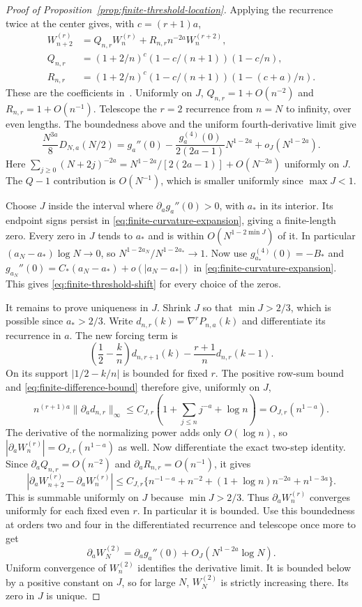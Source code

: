 \begin{proof}[Proof of Proposition~\ref{prop:finite-threshold-location}]
Applying the recurrence twice at the center gives, with $c=(r+1)a$,
\begin{align*}
 W_{n+2}^{(r)}&=Q_{n,r}W_n^{(r)}+R_{n,r}n^{-2a}W_n^{(r+2)},\\
 Q_{n,r}&=(1+2/n)^c(1-c/(n+1))(1-c/n),\\
 R_{n,r}&=(1+2/n)^c(1-c/(n+1))(1-(c+a)/n).
\end{align*}
These are the coefficients in~\cite[(4.11)]{tv2026}.
Uniformly on $J$, $Q_{n,r}=1+O(n^{-2})$ and $R_{n,r}=1+O(n^{-1})$.
Telescope the $r=2$ recurrence from $n=N$ to infinity, over even
lengths. The boundedness above and the uniform fourth-derivative limit give
\begin{equation}\label{eq:finite-curvature-expansion}
 \frac{N^{3a}}8D_{N,a}(N/2)
 =g_a''(0)-\frac{g_a^{(4)}(0)}{2(2a-1)}N^{1-2a}
               +o_J(N^{1-2a}).
\end{equation}
Here $\sum_{j\ge0}(N+2j)^{-2a}
 =N^{1-2a}/[2(2a-1)]+O(N^{-2a})$ uniformly on $J$.
The $Q-1$ contribution is $O(N^{-1})$, which is smaller uniformly
since $\max J<1$.

Choose $J$ inside the interval where $\partial_a g_a''(0)>0$,
with $a_*$ in its interior. Its endpoint signs persist in
\eqref{eq:finite-curvature-expansion}, giving a finite-length zero.
Every zero in $J$ tends to $a_*$ and is within
$O(N^{1-2\min J})$ of it. In particular $(a_N-a_*)\log N\to0$,
so $N^{1-2a_N}/N^{1-2a_*}\to1$. Now use
$g_{a_*}^{(4)}(0)=-B_*$ and
$g_{a_N}''(0)=C_*(a_N-a_*)+o(|a_N-a_*|)$ in
\eqref{eq:finite-curvature-expansion}. This gives
\eqref{eq:finite-threshold-shift} for every choice of the zeros.

It remains to prove uniqueness in $J$. Shrink $J$ so that
$\min J>2/3$, which is possible since $a_*>2/3$.
Write $d_{n,r}(k)=\nabla^rP_{n,a}(k)$ and differentiate its recurrence
in $a$. The new forcing term is
\[
 \left(\frac12-\frac kn\right)d_{n,r+1}(k)
       -\frac{r+1}{n}d_{n,r}(k-1).
\]
On its support $|1/2-k/n|$ is bounded for fixed $r$.
The positive row-sum bound and
\eqref{eq:finite-difference-bound} therefore give, uniformly on $J$,
\[
 n^{(r+1)a}\|\partial_a d_{n,r}\|_\infty
 \le C_{J,r}\left(1+\sum_{j\le n}j^{-a}+\log n\right)
 =O_{J,r}(n^{1-a}).
\]
The derivative of the normalizing power adds only $O(\log n)$, so
$|\partial_a W_n^{(r)}|=O_{J,r}(n^{1-a})$ as well.
Now differentiate the exact two-step identity. Since
$\partial_aQ_{n,r}=O(n^{-2})$ and
$\partial_aR_{n,r}=O(n^{-1})$, it gives
\[
 |\partial_aW_{n+2}^{(r)}-\partial_aW_n^{(r)}|
 \le C_{J,r}\{n^{-1-a}+n^{-2}
             +(1+\log n)n^{-2a}+n^{1-3a}\}.
\]
This is summable uniformly on $J$ because $\min J>2/3$.
Thus $\partial_aW_n^{(r)}$ converges uniformly for each fixed even $r$.
In particular it is bounded. Use this boundedness at orders two and
four in the differentiated recurrence and telescope once more to get
\[
 \partial_aW_N^{(2)}
 =\partial_a g_a''(0)+O_J(N^{1-2a}\log N).
\]
Uniform convergence of $W_n^{(2)}$ identifies the derivative limit.
It is bounded below by a positive constant on $J$, so for large $N$,
$W_N^{(2)}$ is strictly increasing there. Its zero in $J$ is unique.


\end{proof}
